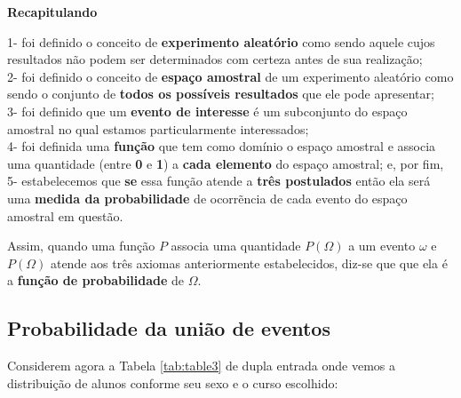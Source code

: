 \documentclass[
]{book}
\begin{document}
\hfill\break

\textbf{Recapitulando}

\hfill\break

1- foi definido o conceito de \textbf{experimento aleatório} como sendo aquele cujos resultados não podem ser determinados com certeza antes de sua realização;\\
2- foi definido o conceito de \textbf{espaço amostral} de um experimento aleatório como sendo o conjunto de \textbf{todos os possíveis resultados} que ele pode apresentar;\\
3- foi definido que um \textbf{evento de interesse} é um subconjunto do espaço amostral no qual estamos particularmente interessados;\\
4- foi definida uma \textbf{função} que tem como domínio o espaço amostral e associa uma quantidade (entre \textbf{0} e \textbf{1}) a \textbf{cada elemento} do espaço amostral; e, por fim,\\
5- estabelecemos que \textbf{se} essa função atende a \textbf{três postulados} então ela será uma \textbf{medida da probabilidade} de ocorrẽncia de cada evento do espaço amostral em questão.

\hfill\break

Assim, quando uma função \(P\) associa uma quantidade \(P(\Omega)\) a um evento \(\omega\) e \(P(\Omega)\) atende aos três axiomas anteriormente estabelecidos, diz-se que que ela é a \textbf{função de probabilidade} de \(\Omega\).

\hfill\break

\hypertarget{probabilidade-da-uniuxe3o-de-eventos}{%
\subsection{Probabilidade da união de eventos}\label{probabilidade-da-uniuxe3o-de-eventos}}

Considerem agora a Tabela \ref{tab:table3} de dupla entrada onde vemos a distribuição de alunos conforme seu sexo e o curso escolhido:

\hfill\break
\end{document}
